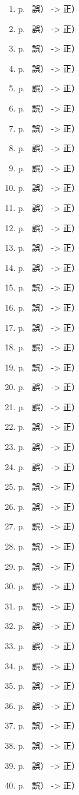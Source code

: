 \begin{enumerate}
  \item p.~ 誤） -> 正）
  \item p.~ 誤） -> 正）
  \item p.~ 誤） -> 正）
  \item p.~ 誤） -> 正）
  \item p.~ 誤） -> 正）
  \item p.~ 誤） -> 正）
  \item p.~ 誤） -> 正）
  \item p.~ 誤） -> 正）
  \item p.~ 誤） -> 正）
  \item p.~ 誤） -> 正）
  \item p.~ 誤） -> 正）
  \item p.~ 誤） -> 正）
  \item p.~ 誤） -> 正）
  \item p.~ 誤） -> 正）
  \item p.~ 誤） -> 正）
  \item p.~ 誤） -> 正）
  \item p.~ 誤） -> 正）
  \item p.~ 誤） -> 正）
  \item p.~ 誤） -> 正）
  \item p.~ 誤） -> 正）
  \item p.~ 誤） -> 正）
  \item p.~ 誤） -> 正）
  \item p.~ 誤） -> 正）
  \item p.~ 誤） -> 正）
  \item p.~ 誤） -> 正）
  \item p.~ 誤） -> 正）
  \item p.~ 誤） -> 正）
  \item p.~ 誤） -> 正）
  \item p.~ 誤） -> 正）
  \item p.~ 誤） -> 正）
  \item p.~ 誤） -> 正）
  \item p.~ 誤） -> 正）
  \item p.~ 誤） -> 正）
  \item p.~ 誤） -> 正）
  \item p.~ 誤） -> 正）
  \item p.~ 誤） -> 正）
  \item p.~ 誤） -> 正）
  \item p.~ 誤） -> 正）
  \item p.~ 誤） -> 正）
  \item p.~ 誤） -> 正）

\end{enumerate}
